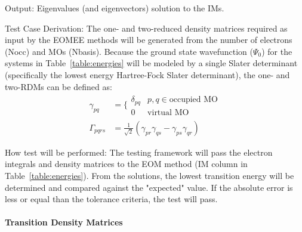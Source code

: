\documentclass[12pt, titlepage]{article}
\begin{document}
\begin{enumerate}
	Output: Eigenvalues (and eigenvectors) solution to the IMs.
	
	Test Case Derivation: 
	The one- and two-reduced density matrices required  as input by the EOMEE 
	methods will be generated from the number of electrons (Nocc) and MOs 
	(Nbasis). Because the ground state wavefunction ($\Psi_0$) for the 
	systems in Table~\ref{table:energies} will be modeled 	by a single Slater 
	determinant (specifically the lowest energy Hartree-Fock Slater 
	determinant), the one- and two-RDMs can be defined as:
	\begin{align*}
	\gamma_{pq} &=\Bigg\{
	\begin{matrix}
	\delta_{pq}& p,q \in \text{occupied MO}\\
	0 & \text{virtual MO}
	\end{matrix}\\
	\Gamma_{pqrs} &= \frac{1}{\sqrt{2}}(\gamma_{pr}\gamma_{qs} - 
	\gamma_{ps}\gamma_{qr})
	\end{align*} 
	
	How test will be performed:
	The testing framework will pass the electron integrals and density matrices 
	to the EOM method (IM column in Table~\ref{table:energies}). From the 
	solutions, the lowest transition energy will be determined and compared 
	against the "expected" value. If the absolute error is less or 
	equal than the tolerance criteria, the test will pass.

	
\end{enumerate}


\paragraph{Transition Density Matrices}
\end{document}
